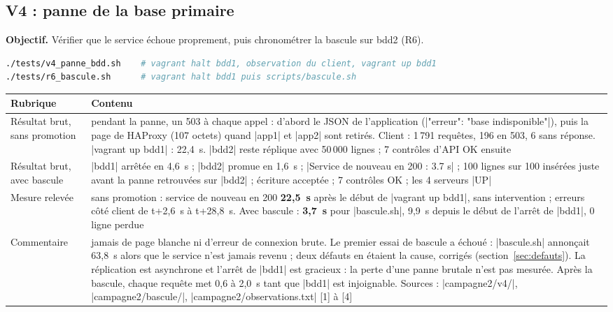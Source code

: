 \documentclass[a4paper,11pt]{article}
\begin{document}
\subsection{V4 : panne de la base primaire}
\textbf{Objectif.} Vérifier que le service échoue proprement, puis chronométrer la bascule sur bdd2 (R6).
\begin{lstlisting}[language=bash]
./tests/v4_panne_bdd.sh    # vagrant halt bdd1, observation du client, vagrant up bdd1
./tests/r6_bascule.sh      # vagrant halt bdd1 puis scripts/bascule.sh
\end{lstlisting}
{\small
\begin{longtable}{@{}L{3.2cm}L{12.4cm}@{}}
\toprule
\textbf{Rubrique} & \textbf{Contenu}\\ \midrule\endhead
Résultat brut, sans promotion & pendant la panne, un 503 à chaque appel : d'abord le JSON de l'application (|{"erreur": "base indisponible"}|), puis la page de HAProxy (107 octets) quand |app1| et |app2| sont retirés. Client : 1\,791 requêtes, 196 en 503, 6 sans réponse. |vagrant up bdd1| : 22,4~s. |bdd2| reste réplique avec 50\,000 lignes ; 7 contrôles d'API OK ensuite\\
Résultat brut, avec bascule & |bdd1| arrêtée en 4,6~s ; |bdd2| promue en 1,6~s ; |Service de nouveau en 200 : 3.7 s| ; 100 lignes sur 100 insérées juste avant la panne retrouvées sur |bdd2| ; écriture acceptée ; 7 contrôles OK ; les 4 serveurs |UP|\\
Mesure relevée & sans promotion : service de nouveau en 200 \textbf{22,5~s} après le début de |vagrant up bdd1|, sans intervention ; erreurs côté client de t+2,6~s à t+28,8~s. Avec bascule : \textbf{3,7~s} pour |bascule.sh|, 9,9~s depuis le début de l'arrêt de |bdd1|, 0 ligne perdue\\
Commentaire & jamais de page blanche ni d'erreur de connexion brute. Le premier essai de bascule a échoué : |bascule.sh| annonçait 63,8~s alors que le service n'est jamais revenu ; deux défauts en étaient la cause, corrigés (section~\ref{sec:defauts}). La réplication est asynchrone et l'arrêt de |bdd1| est gracieux : la perte d'une panne brutale n'est pas mesurée. Après la bascule, chaque requête met 0,6 à 2,0~s tant que |bdd1| est injoignable. Sources : |campagne2/v4/|, |campagne2/bascule/|, |campagne2/observations.txt| [1] à [4]\\
\bottomrule
\end{longtable}}

\end{document}
